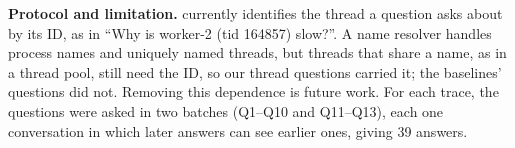 \textbf{Protocol and limitation.} \sysname currently identifies the thread
a question asks about by its ID, as in ``Why is worker-2 (tid 164857)
slow?''. A name resolver handles process names and uniquely named threads,
but threads that share a name, as in a thread pool, still need the ID, so
our thread questions carried it; the baselines' questions did not.
Removing this dependence is future work. For each trace, the questions
were asked in two batches (Q1--Q10 and Q11--Q13), each one conversation in
which later answers can see earlier ones, giving 39 answers.
